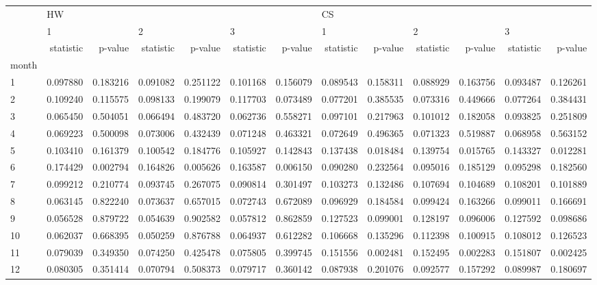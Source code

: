 \begin{tabular}{lrrrrrrrrrrrr}
\toprule
{} & \multicolumn{6}{l}{HW} & \multicolumn{6}{l}{CS} \\
{} & \multicolumn{2}{l}{1} & \multicolumn{2}{l}{2} & \multicolumn{2}{l}{3} & \multicolumn{2}{l}{1} & \multicolumn{2}{l}{2} & \multicolumn{2}{l}{3} \\
{} & statistic &   p-value & statistic &   p-value & statistic &   p-value & statistic &   p-value & statistic &   p-value & statistic &   p-value \\
month &           &           &           &           &           &           &           &           &           &           &           &           \\
\midrule
1     &  0.097880 &  0.183216 &  0.091082 &  0.251122 &  0.101168 &  0.156079 &  0.089543 &  0.158311 &  0.088929 &  0.163756 &  0.093487 &  0.126261 \\
2     &  0.109240 &  0.115575 &  0.098133 &  0.199079 &  0.117703 &  0.073489 &  0.077201 &  0.385535 &  0.073316 &  0.449666 &  0.077264 &  0.384431 \\
3     &  0.065450 &  0.504051 &  0.066494 &  0.483720 &  0.062736 &  0.558271 &  0.097101 &  0.217963 &  0.101012 &  0.182058 &  0.093825 &  0.251809 \\
4     &  0.069223 &  0.500098 &  0.073006 &  0.432439 &  0.071248 &  0.463321 &  0.072649 &  0.496365 &  0.071323 &  0.519887 &  0.068958 &  0.563152 \\
5     &  0.103410 &  0.161379 &  0.100542 &  0.184776 &  0.105927 &  0.142843 &  0.137438 &  0.018484 &  0.139754 &  0.015765 &  0.143327 &  0.012281 \\
6     &  0.174429 &  0.002794 &  0.164826 &  0.005626 &  0.163587 &  0.006150 &  0.090280 &  0.232564 &  0.095016 &  0.185129 &  0.095298 &  0.182560 \\
7     &  0.099212 &  0.210774 &  0.093745 &  0.267075 &  0.090814 &  0.301497 &  0.103273 &  0.132486 &  0.107694 &  0.104689 &  0.108201 &  0.101889 \\
8     &  0.063145 &  0.822240 &  0.073637 &  0.657015 &  0.072743 &  0.672089 &  0.096929 &  0.184584 &  0.099424 &  0.163266 &  0.099011 &  0.166691 \\
9     &  0.056528 &  0.879722 &  0.054639 &  0.902582 &  0.057812 &  0.862859 &  0.127523 &  0.099001 &  0.128197 &  0.096006 &  0.127592 &  0.098686 \\
10    &  0.062037 &  0.668395 &  0.050259 &  0.876788 &  0.064937 &  0.612282 &  0.106668 &  0.135296 &  0.112398 &  0.100915 &  0.108012 &  0.126523 \\
11    &  0.079039 &  0.349350 &  0.074250 &  0.425478 &  0.075805 &  0.399745 &  0.151556 &  0.002481 &  0.152495 &  0.002283 &  0.151807 &  0.002425 \\
12    &  0.080305 &  0.351414 &  0.070794 &  0.508373 &  0.079717 &  0.360142 &  0.087938 &  0.201076 &  0.092577 &  0.157292 &  0.089987 &  0.180697 \\
\bottomrule
\end{tabular}
